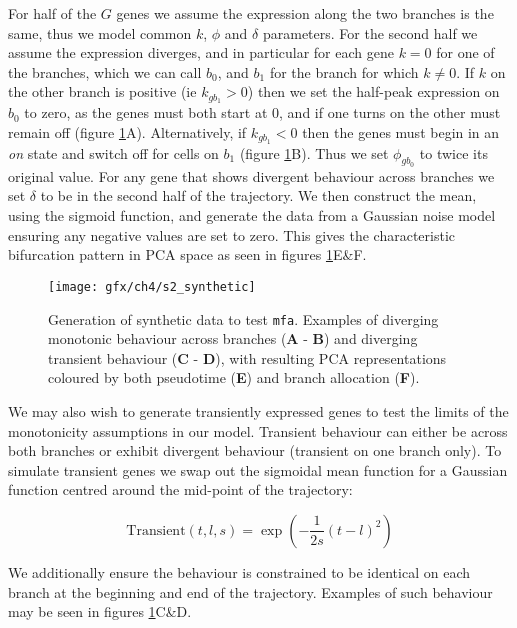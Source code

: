 
For half of the $G$ genes we assume the expression along the two branches is the same, thus we model common $k$, $\phi$ and $\delta$ parameters. For the second half we assume the expression diverges, and in particular for each gene $k = 0$ for one of the branches, which we can call $b_0$, and $b_1$ for the branch for which $k \neq 0$. If $k$ on the other branch is positive (ie $k_{gb_1} > 0$) then we set the half-peak expression on $b_0$ to zero, as the genes must both start at 0, and if one turns on the other must remain off (figure \ref{fig:mfa_synthetic}A).
Alternatively, if $k_{gb_1} < 0$ then the genes must begin in an \emph{on} state and switch off for cells on $b_1$ (figure \ref{fig:mfa_synthetic}B). Thus we set $\phi_{gb_0}$ to twice its original value. For any gene that shows divergent behaviour across branches we set $\delta$ to be in the second half of the trajectory. We then construct the mean, using the sigmoid function, and generate the data from a Gaussian noise model ensuring any negative values are set to zero. This gives the characteristic bifurcation pattern in PCA space as seen in figures \ref{fig:mfa_synthetic}E\&F.


\begin{figure}
	\centering
	\texttt{[image: gfx/ch4/s2\_synthetic]}
	\caption{Generation of synthetic data to test \texttt{mfa}. Examples of diverging monotonic behaviour across branches (\textbf{A} - \textbf{B}) and diverging transient behaviour (\textbf{C} - \textbf{D}), with resulting PCA representations coloured by both pseudotime (\textbf{E}) and branch allocation (\textbf{F}).} \label{fig:mfa_synthetic}
\end{figure}

We may also wish to generate transiently expressed genes to test the limits of the monotonicity assumptions in our model. Transient behaviour can either be across both branches or exhibit divergent behaviour (transient on one branch only). To simulate transient genes we swap out the sigmoidal mean function for a Gaussian function centred around the mid-point of the trajectory:

\begin{equation}
    \text{Transient}(t, l, s)  = \exp( - \frac{1}{2s} (t - l)^2 )
\end{equation}

We additionally ensure the behaviour is constrained to be identical on each branch at the beginning and end of the trajectory. Examples of such behaviour may be seen in figures \ref{fig:mfa_synthetic}C\&D.


